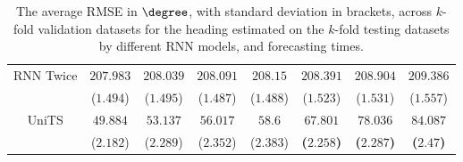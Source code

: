 \begin{table}[!ht]
{\begin{tabular}{|c|c|c|c|c|c|c|c|}
			\multirow{2}{*}{RNN Twice} & $207.983$ & $208.039$ & $208.091$ & $208.15$ & $208.391$ & $208.904$ & $209.386$ \\
			 & ($1.494$) & ($1.495$) & ($1.487$) & ($1.488$) & ($1.523$) & ($1.531$) & ($1.557$) \\ \hline
			\multirow{2}{*}{UniTS} & $49.884$ & $53.137$ & $56.017$ & $58.6$ & $\mathbf{67.801}$ & $\mathbf{78.036}$ & $\mathbf{84.087}$ \\
			 & ($2.182$) & ($2.289$) & ($2.352$) & ($2.383$) & \textbf{(}$\mathbf{2.258}$\textbf{)} & \textbf{(}$\mathbf{2.287}$\textbf{)} & \textbf{(}$\mathbf{2.47}$\textbf{)} \\ \hline
		\end{tabular}
	}
	\caption{The average RMSE in $\degree$, with standard deviation in brackets, across $k$-fold validation datasets for the heading estimated on the $k$-fold testing datasets by different RNN models, and forecasting times.}
	\label{tab:all_direction_RMSE}
\end{table}

